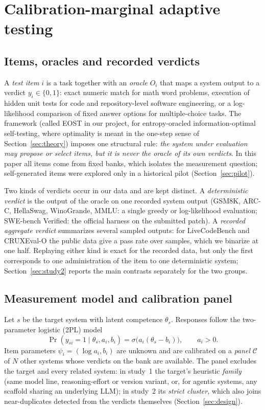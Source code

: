 \section{Calibration-marginal adaptive testing}
\label{sec:framework}

\subsection{Items, oracles and recorded verdicts}
A \emph{test item} $i$ is a task together with an \emph{oracle} $O_i$ that maps a system
output to a verdict $y_i\in\{0,1\}$: exact numeric match for math word problems,
execution of hidden unit tests for code and repository-level software engineering, or a
log-likelihood comparison of fixed answer options for multiple-choice tasks. The framework
(called EOST in our project, for entropy-oracled information-optimal self-testing, where
optimality is meant in the one-step sense of Section~\ref{sec:theory}) imposes
one structural rule: \emph{the system under evaluation may propose or select items, but it
is never the oracle of its own verdicts}. In this paper all items come from fixed banks,
which isolates the measurement question; self-generated items were explored only in a
historical pilot (Section~\ref{sec:pilot}).

Two kinds of verdicts occur in our data and are kept distinct. A \emph{deterministic
verdict} is the output of the oracle on one recorded system output (GSM8K, ARC-C,
HellaSwag, WinoGrande, MMLU: a single greedy or log-likelihood evaluation; SWE-bench
Verified: the official harness on the submitted patch). A \emph{recorded aggregate
verdict} summarizes several sampled outputs: for LiveCodeBench and CRUXEval-O the public
data give a pass rate over samples, which we binarize at one half. Replaying either kind
is exact for the recorded data, but only the first corresponds to one administration of
the item to one deterministic system; Section~\ref{sec:study2} reports the main contrasts
separately for the two groups.

\subsection{Measurement model and calibration panel}
Let $s$ be the target system with latent competence $\theta_s$. Responses follow
the two-parameter logistic (2PL) model
\begin{equation}
\Pr(y_{si}=1\mid\theta_s,a_i,b_i)=\sigma\big(a_i(\theta_s-b_i)\big),\qquad a_i>0 .
\end{equation}
Item parameters $\psi_i=(\log a_i,b_i)$ are unknown and are calibrated on a
\emph{panel} $\mathcal C$ of $N$ other systems whose verdicts on the bank are
available. The panel excludes the target and every related system: in study~1 the
target's heuristic \emph{family} (same model line, reasoning-effort or version variant,
or, for agentic systems, any scaffold sharing an underlying LLM); in study~2 its
\emph{strict cluster}, which also joins near-duplicates detected from the verdicts
themselves (Section~\ref{sec:design}).

